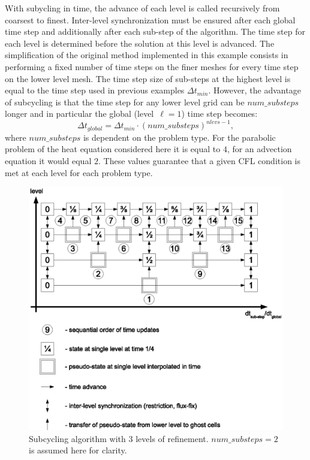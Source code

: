 With subycling in time, the advance of each level is called recursively from coarsest to finest.
Inter-level synchronization must be ensured after each global time step and
additionally after each sub-step of the algorithm. The time step for each level is determined before the
solution at this level is advanced. The simplification of the original method implemented in this example consists
in performing a fixed number of time steps on the finer meshes for every time step on the lower level mesh.
The time step size of sub-steps at the highest level is equal to the time step used in previous examples 
$\Delta t_{min}$. However, the advantage of subcycling is that the time step for any lower level grid can be
$num\_substeps$ longer and in particular the global (level~$\ell=1$) time step becomes:
\begin{equation}
	\Delta t_{global} = \Delta t_{min}  \cdot {(num\_substeps)}^{nlevs-1},
\end{equation}
where $num\_substeps$ is dependent on the problem type. For the parabolic problem of the heat equation
considered here it is equal to $4$, for an advection equation it would equal $2$. These values guarantee
that a given CFL condition is met at each level for each problem type.

\begin{figure}[tb]
\centering
\includegraphics{./F_AdvancedTopics/subcycling_algorithm}
\caption{\label{fig:subcycling_algorithm} Subcycling algorithm with 3 levels of refinement. 
        $num\_substeps=2$ is assumed here for clarity. }
\end{figure}

